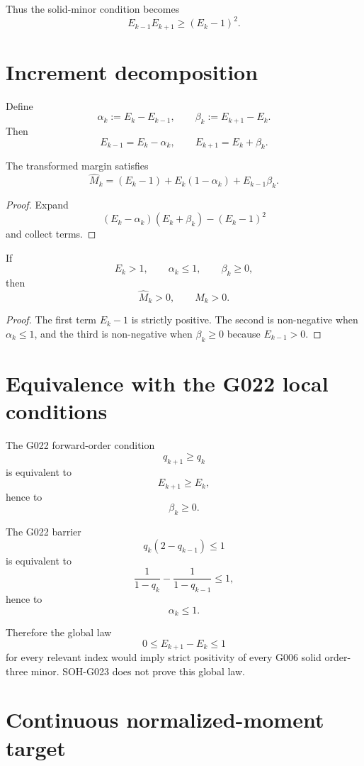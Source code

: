 Thus the solid-minor condition becomes
\[
 \boxed{
 E_{k-1}E_{k+1}\ge(E_k-1)^2.
 }
\]

\section{Increment decomposition}

Define
\[
 \alpha_k:=E_k-E_{k-1},
 \qquad
 \beta_k:=E_{k+1}-E_k.
\]
Then
\[
 E_{k-1}=E_k-\alpha_k,
 \qquad
 E_{k+1}=E_k+\beta_k.
\]

\begin{theorem}
The transformed margin satisfies
\[
 \boxed{
 \widehat M_k
 =(E_k-1)+E_k(1-\alpha_k)+E_{k-1}\beta_k.
 }
\]
\end{theorem}

\begin{proof}
Expand
\[
 (E_k-\alpha_k)(E_k+\beta_k)-(E_k-1)^2
\]
and collect terms.
\end{proof}

\begin{corollary}
If
\[
 E_k>1,
 \qquad
 \alpha_k\le1,
 \qquad
 \beta_k\ge0,
\]
then
\[
 \boxed{\widehat M_k>0},
 \qquad
 \boxed{M_k>0}.
\]
\end{corollary}

\begin{proof}
The first term $E_k-1$ is strictly positive. The second is non-negative when
$\alpha_k\le1$, and the third is non-negative when $\beta_k\ge0$ because
$E_{k-1}>0$.
\end{proof}

\section{Equivalence with the G022 local conditions}

The G022 forward-order condition
\[
 q_{k+1}\ge q_k
\]
is equivalent to
\[
 E_{k+1}\ge E_k,
\]
hence to
\[
 \boxed{\beta_k\ge0.}
\]

The G022 barrier
\[
 q_k(2-q_{k-1})\le1
\]
is equivalent to
\[
 \frac1{1-q_k}-\frac1{1-q_{k-1}}\le1,
\]
hence to
\[
 \boxed{\alpha_k\le1.}
\]

Therefore the global law
\[
 \boxed{
 0\le E_{k+1}-E_k\le1
 }
\]
for every relevant index would imply strict positivity of every G006 solid
order-three minor. SOH-G023 does not prove this global law.

\section{Continuous normalized-moment target}

